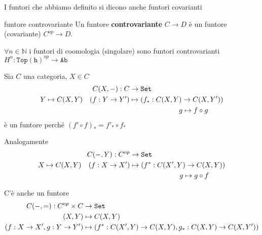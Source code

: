\begin{note}{}
    I funtori che abbiamo definito si dicono anche funtori covarianti
\end{note}
\begin{definition}{funtore controvariante}
    Un funtore \textbf{controvariante} \(C \to D\) è un funtore (covariante) \(C^{op} \to D\).
\end{definition}
\begin{example}{}
    \(\forall n \in \mathbb{N}\) i funtori di coomologia (singolare) sono funtori
    controvarianti \(H^{n} : \mathtt{Top(h)}^{op} \to \mathtt{Ab}\) 
\end{example}
\begin{example}{}
    Sia \(C\) una categoria, \(X \in C\)
    \begin{align*}
        C{(X, \--)} : C &\to \mathtt{Set} \\
        Y \mapsto C{(X, Y)} \quad {(f : Y \to Y')} &\mapsto {(f_{*} : C{(X, Y)} \to C{(X, Y')})} \\
            & \quad \quad \quad \quad\quad\quad\quad  g \mapsto f \circ g
    \end{align*}
    è un funtore perché \({(f' \circ f)}_* = f'_* \circ f_*\) 

    Analogamente 
    \begin{align*}
        C{(\--, Y)} : C^{op} &\to \mathtt{Set} \\
        X \mapsto C{(X, Y)} \quad {(f : X \to X')} &\mapsto {(f^{*} : C{(X', Y)} \to C{(X, Y)})} \\
            & \quad \quad \quad \quad\quad\quad\quad  g \mapsto g \circ f
    \end{align*}
\end{example}
\begin{remark}{}
    C'è anche un funtore 
    \begin{align*}
        C{(\--, =)} : C^{op} \times C &\to \mathtt{Set} \\
        {(X, Y)} &\mapsto C{(X, Y)} \\
        {(f : X \to X', g : Y \to Y')} &\mapsto {(f^* : C{(X', Y)} \to  C{(X,Y)}, g_* : C{(X, Y)} \to C{(X, Y')})}
    \end{align*}
\end{remark}
